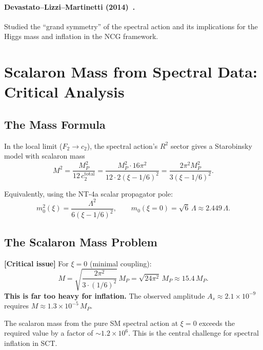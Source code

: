 \documentclass[11pt,a4paper]{article}
\theoremstyle{plain}
\theoremstyle{definition}
\newcommand{\signcorrection}[1]{%
  \par\smallskip\noindent
  \colorbox{red!10}{\parbox{\dimexpr\linewidth-2\fboxsep}{%
    \textcolor{red!60!black}{\textbf{[Critical issue]}} #1}}%
  \par\smallskip}
\begin{document}
\paragraph{Devastato--Lizzi--Martinetti (2014)~\cite{DLM14}.}
Studied the ``grand symmetry'' of the spectral action and its
implications for the Higgs mass and inflation in the NCG framework.

\section{Scalaron Mass from Spectral Data: Critical Analysis}
\label{sec:scalaron-mass}

\subsection{The Mass Formula}

In the local limit ($F_2 \to c_2$), the spectral action's $R^2$ sector
gives a Starobinsky model with scalaron mass
\begin{equation}\label{eq:M-from-c2}
  M^2 = \frac{M_P^2}{12\,c_2^{\mathrm{total}}}
  = \frac{M_P^2 \cdot 16\pi^2}{12 \cdot 2(\xi - 1/6)^2}
  = \frac{2\pi^2 M_P^2}{3(\xi - 1/6)^2}.
\end{equation}

Equivalently, using the NT-4a scalar propagator pole:
\begin{equation}\label{eq:m0-from-nt4a}
  m_0^2(\xi) = \frac{\Lambda^2}{6(\xi - 1/6)^2},
  \qquad m_0(\xi = 0) = \sqrt{6}\,\Lambda \approx 2.449\,\Lambda.
\end{equation}

\subsection{The Scalaron Mass Problem}

\signcorrection{
For $\xi = 0$ (minimal coupling):
\begin{equation}\label{eq:M-xi0}
  M = \sqrt{\frac{2\pi^2}{3 \cdot (1/6)^2}}\,M_P
  = \sqrt{24\pi^2}\,M_P \approx 15.4\,M_P.
\end{equation}
\textbf{This is far too heavy for inflation.} The observed amplitude
$A_s \approx 2.1 \times 10^{-9}$ requires
$M \approx 1.3 \times 10^{-5}\,M_P$.

The scalaron mass from the pure SM spectral action at $\xi = 0$
exceeds the required value by a factor of $\sim 1.2 \times 10^6$.
This is the central challenge for spectral inflation in SCT.}
\end{document}
